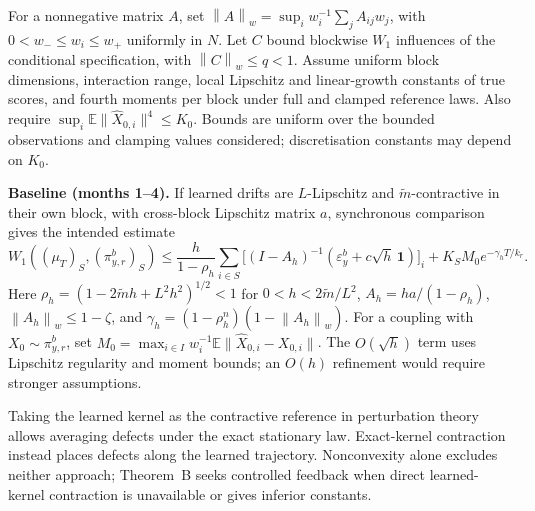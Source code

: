 \documentclass[12pt,a4paper]{article}
\newcommand{\E}{\mathbb E}
\newcommand{\W}{W_1}
\newcommand{\pir}{\pi_{y,r}^{b}}
\newcommand{\epsb}{\varepsilon^{b}_{y}}
\newcommand{\normw}[1]{\left\|#1\right\|_w}
\begin{document}
For a nonnegative matrix $A$, set $\normw{A}=\sup_i w_i^{-1}\sum_j A_{ij}w_j$, with $0<w_-\leq w_i\leq w_+$ uniformly in $N$. Let $C$ bound blockwise $\W$ influences of the conditional specification, with $\normw{C}\leq q<1$. Assume uniform block dimensions, interaction range, local Lipschitz and linear-growth constants of true scores, and fourth moments per block under full and clamped reference laws. Also require $\sup_i\E\|\widehat X_{0,i}\|^4\leq K_0$. Bounds are uniform over the bounded observations and clamping values considered; discretisation constants may depend on $K_0$.

\textbf{Baseline (months 1--4).} If learned drifts are $L$-Lipschitz and $\widetilde m$-contractive in their own block, with cross-block Lipschitz matrix $a$, synchronous comparison gives the intended estimate
\begin{equation}\label{eq:baseline}
 \W((\mu_T)_S,(\pir)_S)
 \leq\frac{h}{1-\rho_h}\sum_{i\in S}\bigl[(I-A_h)^{-1}
 (\epsb+c\sqrt h\,\mathbf1)\bigr]_i
 +K_SM_0e^{-\gamma_h T/k_r}.
\end{equation}
Here $\rho_h=(1-2\widetilde mh+L^2h^2)^{1/2}<1$ for $0<h<2\widetilde m/L^2$, $A_h=ha/(1-\rho_h)$, $\normw{A_h}\leq1-\zeta$, and $\gamma_h=(1-\rho_h^n)(1-\normw{A_h})$. For a coupling with $X_0\sim\pir$, set $M_0=\max_{i\in I}w_i^{-1}\E\|\widehat X_{0,i}-X_{0,i}\|$. The $O(\sqrt h)$ term uses Lipschitz regularity and moment bounds; an $O(h)$ refinement would require stronger assumptions.

Taking the learned kernel as the contractive reference in perturbation theory \cite{RS18} allows averaging defects under the exact stationary law. Exact-kernel contraction instead places defects along the learned trajectory. Nonconvexity alone excludes neither approach; Theorem~B seeks controlled feedback when direct learned-kernel contraction is unavailable or gives inferior constants.
\end{document}
